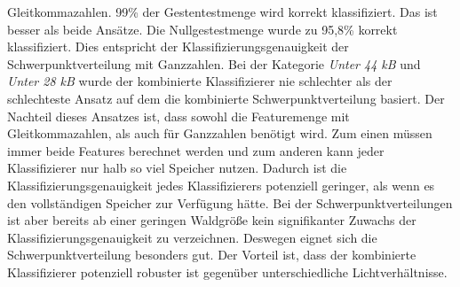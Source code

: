Gleitkommazahlen. 99\% der Gestentestmenge wird korrekt klassifiziert. Das ist besser als beide Ansätze. Die Nullgestestmenge wurde zu 95,8\% korrekt klassifiziert. Dies entspricht der Klassifizierungsgenauigkeit der
Schwerpunktverteilung mit Ganzzahlen. Bei der Kategorie \textit{Unter 44 kB} und \textit{Unter 28 kB} wurde der kombinierte Klassifizierer nie schlechter als der schlechteste Ansatz auf dem die kombinierte
Schwerpunktverteilung basiert.
\newline
\newline
Der Nachteil dieses Ansatzes ist, dass sowohl die Featuremenge mit Gleitkommazahlen, als auch für Ganzzahlen benötigt wird. Zum einen müssen immer beide Features berechnet werden und zum anderen kann jeder Klassifizierer
nur halb so viel Speicher nutzen. Dadurch ist die Klassifizierungsgenauigkeit jedes Klassifizierers potenziell geringer, als wenn es den vollständigen Speicher zur Verfügung hätte. Bei der Schwerpunktverteilungen ist aber
bereits ab einer geringen Waldgröße kein signifikanter Zuwachs der Klassifizierungsgenauigkeit zu verzeichnen. Deswegen eignet sich die Schwerpunktverteilung besonders gut. Der Vorteil ist, dass der kombinierte
Klassifizierer potenziell robuster ist gegenüber unterschiedliche Lichtverhältnisse.

